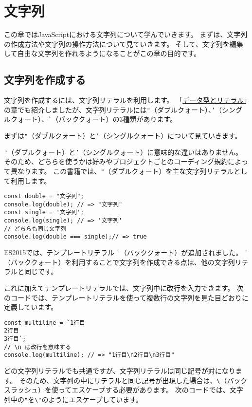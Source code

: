 \hypertarget{string}{%
\chapter{文字列}\label{string}}
\thispagestyle{frontheadings}

この章ではJavaScriptにおける文字列について学んでいきます。
まずは、文字列の作成方法や文字列の操作方法について見ていきます。
そして、文字列を編集して自由な文字列を作れるようになることがこの章の目的です。

\hypertarget{create}{%
\section{文字列を作成する}\label{create}}

文字列を作成するには、文字列リテラルを利用します。
「\hyperlink{data-type-and-literal}{データ型とリテラル}」の章でも紹介しましたが、文字列リテラルには\texttt{"}（ダブルクォート）、\texttt{'}（シングルクォート）、\lstinline{`}（バッククォート）の3種類があります。

まずは\texttt{"}（ダブルクォート）と\texttt{'}（シングルクォート）について見ていきます。

\texttt{"}（ダブルクォート）と\texttt{'}（シングルクォート）に意味的な違いはありません。
そのため、どちらを使うかは好みやプロジェクトごとのコーディング規約によって異なります。
この書籍では、\texttt{"}（ダブルクォート）を主な文字列リテラルとして利用します。

\begin{lstlisting}
const double = "文字列";
console.log(double); // => "文字列"
const single = '文字列';
console.log(single); // => '文字列'
// どちらも同じ文字列
console.log(double === single);// => true
\end{lstlisting}

ES2015では、テンプレートリテラル
\lstinline{`}（バッククォート）が追加されました。
\lstinline{`}（バッククォート）を利用することで文字列を作成できる点は、他の文字列リテラルと同じです。

これに加えてテンプレートリテラルでは、文字列中に改行を入力できます。
次のコードでは、テンプレートリテラルを使って複数行の文字列を見た目どおりに定義しています。

\begin{lstlisting}
const multiline = `1行目
2行目
3行目`;
// \n は改行を意味する
console.log(multiline); // => "1行目\n2行目\n3行目"
\end{lstlisting}

どの文字列リテラルでも共通ですが、文字列リテラルは同じ記号が対になります。
そのため、文字列の中にリテラルと同じ記号が出現した場合は、\texttt{\textbackslash}（バックスラッシュ）を使ってエスケープする必要があります。
次のコードでは、文字列中の\texttt{"}を\texttt{\textbackslash"}のようにエスケープしています。

